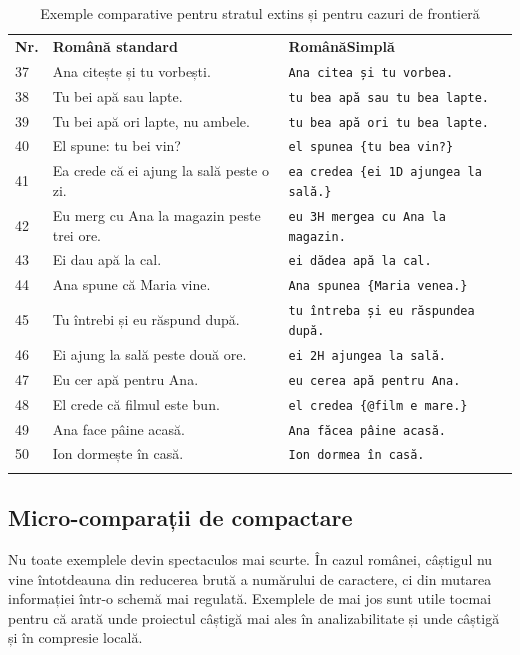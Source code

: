 \documentclass[12pt,onecolumn,letterpaper]{article}
\newcommand{\rs}[1]{\texttt{#1}}
\newcommand{\RStablelayout}{%
\footnotesize
\setlength{\tabcolsep}{6pt}%
\renewcommand{\arraystretch}{1.12}%
\arrayrulecolor{RSRule}%
}
\begin{document}
\RStablelayout
\begin{longtable}{@{}p{0.6cm}p{5.4cm}p{5.5cm}@{}}
\rowcolor{RSGray}
\textbf{Nr.} & \textbf{Română standard} & \textbf{RomânăSimplă} \\
37 & Ana citește și tu vorbești. & \rs{Ana citea și tu vorbea.} \\
38 & Tu bei apă sau lapte. & \rs{tu bea apă sau tu bea lapte.} \\
39 & Tu bei apă ori lapte, nu ambele. & \rs{tu bea apă ori tu bea lapte.} \\
40 & El spune: tu bei vin? & \rs{el spunea \{tu bea vin?\}} \\
41 & Ea crede că ei ajung la sală peste o zi. & \rs{ea credea \{ei 1D ajungea la sală.\}} \\
42 & Eu merg cu Ana la magazin peste trei ore. & \rs{eu 3H mergea cu Ana la magazin.} \\
43 & Ei dau apă la cal. & \rs{ei dădea apă la cal.} \\
44 & Ana spune că Maria vine. & \rs{Ana spunea \{Maria venea.\}} \\
45 & Tu întrebi și eu răspund după. & \rs{tu întreba și eu răspundea după.} \\
46 & Ei ajung la sală peste două ore. & \rs{ei 2H ajungea la sală.} \\
47 & Eu cer apă pentru Ana. & \rs{eu cerea apă pentru Ana.} \\
48 & El crede că filmul este bun. & \rs{el credea \{@film e mare.\}} \\
49 & Ana face pâine acasă. & \rs{Ana făcea pâine acasă.} \\
50 & Ion dormește în casă. & \rs{Ion dormea în casă.} \\
\bottomrule
\caption{Exemple comparative pentru stratul extins și pentru cazuri de frontieră}
\end{longtable}

\subsection{Micro-comparații de compactare}

Nu toate exemplele devin spectaculos mai scurte. În cazul românei, câștigul nu
vine întotdeauna din reducerea brută a numărului de caractere, ci din mutarea
informației într-o schemă mai regulată. Exemplele de mai jos sunt utile tocmai
pentru că arată unde proiectul câștigă mai ales în analizabilitate și unde
câștigă și în compresie locală.
\end{document}
